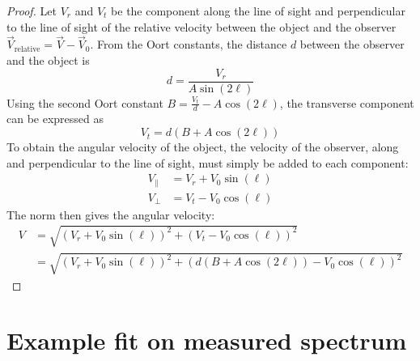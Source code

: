 \begin{proof}
    Let $V_r$ and $V_t$ be the component along the line of sight and perpendicular to the line of sight of the relative velocity between the object and the observer $\vec V_\textrm{relative} = \vec V - \vec V_0$. From the Oort constants, the distance $d$ between the observer and the object is
    \begin{equation}
        d = \frac{V_r}{A \sin(2\ell)}
    \end{equation}
    Using the second Oort constant $B = \frac{V_t}{d} - A \cos(2\ell)$, the transverse component can be expressed as
    \begin{equation}
        V_t = d (B + A \cos(2\ell))
    \end{equation}
    To obtain the angular velocity of the object, the velocity of the observer, along and perpendicular to the line of sight, must simply be added to each component:
    \begin{align}
        V_{\parallel} &= V_r + V_0 \sin(\ell) \\
        V_{\perp} &= V_t - V_0 \cos(\ell)
    \end{align}
    The norm then gives the angular velocity:
    \begin{equation}
        \begin{aligned}
            V &= \sqrt{(V_r + V_0 \sin(\ell))^2 + (V_t - V_0 \cos(\ell))^2} \\
            &= \sqrt{(V_r + V_0 \sin(\ell))^2 + (d (B + A \cos(2\ell)) - V_0 \cos(\ell))^2}
        \end{aligned}
    \end{equation}
\end{proof}

\section{Example fit on measured spectrum}
\label{sec:fittings}


